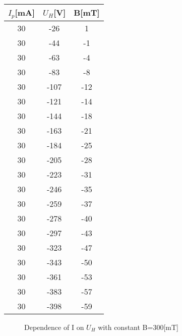 \documentclass[a4paper,12pt]{article}
\begin{document}
\begin{table}[H]
\begin{minipage}{.5\linewidth}
\begin{tabular}{|c|c|c|}
\end{tabular}
\end{minipage}%
\begin{minipage}{.5\linewidth}
\centering
\begin{tabular}{|c|c|c|}
\hline
$I_p$[mA] & $U_H$[V] & B[mT] \\   
\hline
\hline
30    & -26 &	1\\
\hline
30    & -44 &	-1\\
\hline
30    & -63 &	-4\\
\hline
30    & -83 &	-8\\
\hline
30    & -107 &	-12\\
\hline
30    & -121 &	-14\\
\hline
30    & -144 &	-18\\
\hline
30    & -163 &	-21\\
\hline
30    & -184 &	-25\\
\hline
30    & -205 &	-28\\
\hline
30    & -223 &	-31\\
\hline
30    & -246 &	-35\\
\hline
30    & -259 &	-37\\
\hline
30    & -278 &	-40\\
\hline
30    & -297 &	-43\\
\hline
30    & -323 &	-47\\
\hline
30    & -343 &	-50\\
\hline
30    & -361 &	-53\\
\hline
30    & -383 &	-57\\
\hline
30    & -398 &	-59\\
\hline
\end{tabular}
\end{minipage} 
\end{table}

\begin{figure} [p]
\begin{center}
\caption{Dependence of I on $U_H$ with constant B=300[mT]}
\end{center}
\end{figure}
\end{document}
